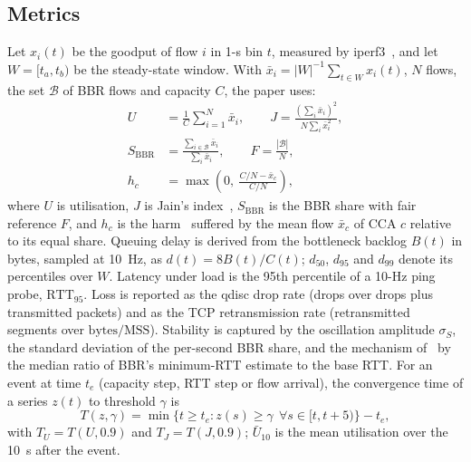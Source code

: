 \documentclass[conference]{IEEEtran}
\newcommand{\SB}{S_{\mathrm{BBR}}}
\newcommand{\dq}[1]{d_{#1}}
\begin{document}
\subsection{Metrics}
Let $x_i(t)$ be the goodput of flow $i$ in 1-s bin $t$, measured by iperf3~\cite{iperf3}, and let $W=[t_a,t_b)$ be the steady-state window. With $\bar{x}_i=|W|^{-1}\sum_{t\in W}x_i(t)$, $N$ flows, the set $\mathcal{B}$ of BBR flows and capacity $C$, the paper uses:
\begin{align}
U &= \frac{1}{C}\sum_{i=1}^{N}\bar{x}_i, \qquad
J = \frac{\left(\sum_i \bar{x}_i\right)^2}{N\sum_i \bar{x}_i^2}, \label{eq:uj}\\
\SB &= \frac{\sum_{i\in\mathcal{B}}\bar{x}_i}{\sum_{i}\bar{x}_i}, \qquad F=\frac{|\mathcal{B}|}{N}, \label{eq:share}\\
h_c &= \max\!\left(0,\ \frac{C/N-\bar{x}_c}{C/N}\right), \label{eq:harm}
\end{align}
where $U$ is utilisation, $J$ is Jain's index~\cite{jain1984fairness}, $\SB$ is the BBR share with fair reference $F$, and $h_c$ is the harm~\cite{ware2019harm} suffered by the mean flow $\bar{x}_c$ of CCA $c$ relative to its equal share. Queuing delay is derived from the bottleneck backlog $B(t)$ in bytes, sampled at 10~Hz, as $d(t)=8B(t)/C(t)$; $\dq{50}$, $\dq{95}$ and $\dq{99}$ denote its percentiles over $W$. Latency under load is the 95th percentile of a 10-Hz ping probe, $\mathrm{RTT}_{95}$. Loss is reported as the qdisc drop rate (drops over drops plus transmitted packets) and as the TCP retransmission rate (retransmitted segments over $\text{bytes}/\text{MSS}$). Stability is captured by the oscillation amplitude $\sigma_S$, the standard deviation of the per-second BBR share, and the mechanism of~\cite{scherrer2026control} by the median ratio of BBR's minimum-RTT estimate to the base RTT. For an event at time $t_e$ (capacity step, RTT step or flow arrival), the convergence time of a series $z(t)$ to threshold $\gamma$ is
\begin{equation}
T(z,\gamma) = \min\{t\ge t_e : z(s)\ge\gamma\ \ \forall s\in[t,t+5)\} - t_e, \label{eq:conv}
\end{equation}
with $T_U=T(U,0.9)$ and $T_J=T(J,0.9)$; $\bar{U}_{10}$ is the mean utilisation over the 10~s after the event.
\end{document}
